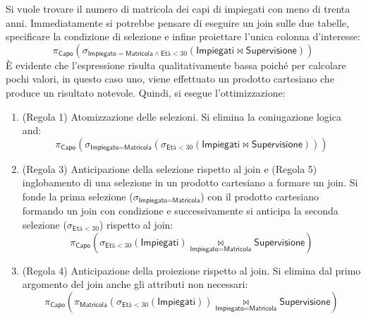 \documentclass[a4paper]{article}
\begin{document}
	\noindent
	Si vuole trovare il numero di matricola dei capi di impiegati con meno di trenta anni. Immediatamente si potrebbe pensare di eseguire un join sulle due tabelle, specificare la condizione di selezione e infine proiettare l'unica colonna d'interesse:
	\begin{equation*}
		\pi_{\textsf{Capo}}\left(\sigma_{\textsf{Impiegato} = \textsf{Matricola} \land \textsf{Età} < 30} \left(\textsf{Impiegati} \Join \textsf{Supervisione}\right)\right)
	\end{equation*}
	È evidente che l'espressione risulta qualitativamente bassa poiché per calcolare pochi valori, in questo caso uno, viene effettuato un prodotto cartesiano che produce un risultato notevole. Quindi, si esegue l'ottimizzazione:
	\begin{enumerate}
		\item (Regola 1) Atomizzazione delle selezioni. Si elimina la coniugazione logica and:
		\begin{equation*}
			\pi_{\textsf{Capo}}\left(\sigma_{\textsf{Impiegato} = \textsf{Matricola}} \left(\sigma_{\textsf{Età} < 30} \left(\textsf{Impiegati} \Join \textsf{Supervisione}\right)\right)\right)
		\end{equation*}
	
		\item (Regola 3) Anticipazione della selezione rispetto al join e (Regola 5) inglobamento di una selezione in un prodotto cartesiano a formare un join. Si fonde la prima selezione ($\sigma_{\textsf{Impiegato} = \textsf{Matricola}}$) con il prodotto cartesiano formando un join con condizione e successivamente si anticipa la seconda selezione ($\sigma_{\textsf{Età} < 30}$) rispetto al join:
		\begin{equation*}
			\pi_{\textsf{Capo}}\left(
			\sigma_{\textsf{Età} < 30}\left(\textsf{Impiegati}\right) \underset{\textsf{Impiegato} = \textsf{Matricola}}{\Join} \textsf{Supervisione}
			\right)
		\end{equation*}
		
		\item (Regola 4) Anticipazione della proiezione rispetto al join. Si elimina dal primo argomento del join anche gli attributi non necessari:
		\begin{equation*}
			\pi_{\textsf{Capo}}\left(
			\pi_{\textsf{Matricola}}\left(\sigma_{\textsf{Età} < 30}\left(\textsf{Impiegati}\right)\right)
			\underset{\textsf{Impiegato} = \textsf{Matricola}}{\Join}
			\textsf{Supervisione}
			\right)
		\end{equation*}
	\end{enumerate}\newpage
\end{document}
